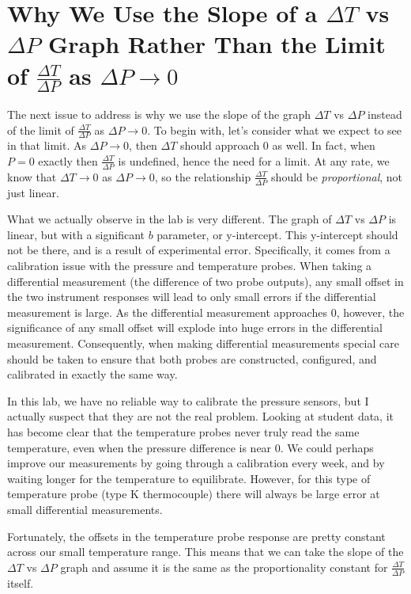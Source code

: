 \documentclass[12pt,letterpaper]{article}
\begin{document}
	\section{Why We Use the Slope of a $\Delta T$ vs $\Delta P$ Graph Rather Than the Limit of $\frac{\Delta T}{\Delta P}$ as $\Delta P \rightarrow 0$}
	
	The next issue to address is why we use the slope of the graph $\Delta T$ vs $\Delta P$ instead of the limit of $\frac{\Delta T}{\Delta P}$ as $\Delta P \rightarrow 0$. To begin with, let's consider what we expect to see in that limit. As $\Delta P \rightarrow 0$, then $\Delta T$ should approach $0$ as well. In fact, when $P=0$ exactly then $\frac{\Delta T}{\Delta P}$ is undefined, hence the need for a limit. At any rate, we know that $\Delta T \rightarrow 0$ as $\Delta P \rightarrow 0$, so the relationship $\frac{\Delta T}{\Delta P}$ should be \emph{proportional}, not just linear.
	
	What we actually observe in the lab is very different. The graph of $\Delta T$ vs $\Delta P$ is linear, but with a significant $b$ parameter, or y-intercept. This y-intercept should not be there, and is a result of experimental error. Specifically, it comes from a calibration issue with the pressure and temperature probes. When taking a differential measurement (the difference of two probe outputs), any small offset in the two instrument responses will lead to only small errors if the differential measurement is large. As the differential measurement approaches $0$, however, the significance of any small offset will explode into huge errors in the differential measurement. Consequently, when making differential measurements special care should be taken to ensure that both probes are constructed, configured, and calibrated in exactly the same way.
	
	In this lab, we have no reliable way to calibrate the pressure sensors, but I actually suspect that they are not the real problem. Looking at student data, it has become clear that the temperature probes never truly read the same temperature, even when the pressure difference is near $0$. We could perhaps improve our measurements by going through a calibration every week, and by waiting longer for the temperature to equilibrate. However, for this type of temperature probe (type K thermocouple) there will always be large error at small differential measurements.
	
	Fortunately, the offsets in the temperature probe response are pretty constant across our small temperature range. This means that we can take the slope of the $\Delta T$ vs $\Delta P$ graph and assume it is the same as the proportionality constant for $\frac{\Delta T}{\Delta P}$ itself.
	
\end{document}
